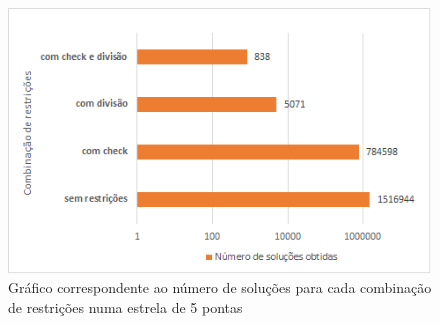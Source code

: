 \begin{figure}[!h]
\includegraphics[width=\textwidth]{images/solutions_restriction_combinations.png}
\caption{Gráfico correspondente ao número de soluções para cada combinação de restrições numa estrela de 5 pontas} \label{fig:numero_solucoes_combinacao_restricoes}
\end{figure}

